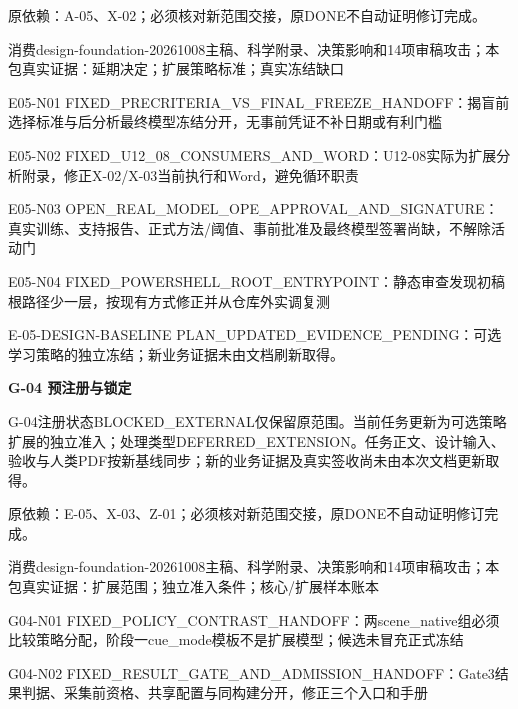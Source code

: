 \documentclass[11pt,a4paper]{article}
\newcommand{\reviewsection}[1]{\par\Needspace{5\baselineskip}\vspace{10pt}\begin{center}{\titlelatin\titlecjk\bfseries\fontsize{14}{20}\selectfont #1}\end{center}}
\begin{document}
原依赖：A-\allowbreak{}05、X-\allowbreak{}02；必须核对新范围交接，原DONE不自动证明修订完成。


消费design-\allowbreak{}foundation-\allowbreak{}20261008主稿、科学附录、决策影响和14项审稿攻击；本包真实证据：延期决定；扩展策略标准；真实冻结缺口


E05-\allowbreak{}N01 FIXED\_\allowbreak{}PRECRITERIA\_\allowbreak{}VS\_\allowbreak{}FINAL\_\allowbreak{}FREEZE\_\allowbreak{}HANDOFF：揭盲前选择标准与后分析最终模型冻结分开，无事前凭证不补日期或有利门槛


E05-\allowbreak{}N02 FIXED\_\allowbreak{}U12\_\allowbreak{}08\_\allowbreak{}CONSUMERS\_\allowbreak{}AND\_\allowbreak{}WORD：U12-\allowbreak{}08实际为扩展分析附录，修正X-\allowbreak{}02/\allowbreak{}X-\allowbreak{}03当前执行和Word，避免循环职责


E05-\allowbreak{}N03 OPEN\_\allowbreak{}REAL\_\allowbreak{}MODEL\_\allowbreak{}OPE\_\allowbreak{}APPROVAL\_\allowbreak{}AND\_\allowbreak{}SIGNATURE：真实训练、支持报告、正式方法/\allowbreak{}阈值、事前批准及最终模型签署尚缺，不解除活动门


E05-\allowbreak{}N04 FIXED\_\allowbreak{}POWERSHELL\_\allowbreak{}ROOT\_\allowbreak{}ENTRYPOINT：静态审查发现初稿根路径少一层，按现有方式修正并从仓库外实调复测


E-\allowbreak{}05-\allowbreak{}DESIGN-\allowbreak{}BASELINE PLAN\_\allowbreak{}UPDATED\_\allowbreak{}EVIDENCE\_\allowbreak{}PENDING：可选学习策略的独立冻结；新业务证据未由文档刷新取得。


\reviewsection{G-\allowbreak{}04 预注册与锁定}
G-\allowbreak{}04注册状态BLOCKED\_\allowbreak{}EXTERNAL仅保留原范围。当前任务更新为可选策略扩展的独立准入；处理类型DEFERRED\_\allowbreak{}EXTENSION。任务正文、设计输入、验收与人类PDF按新基线同步；新的业务证据及真实签收尚未由本次文档更新取得。


原依赖：E-\allowbreak{}05、X-\allowbreak{}03、Z-\allowbreak{}01；必须核对新范围交接，原DONE不自动证明修订完成。


消费design-\allowbreak{}foundation-\allowbreak{}20261008主稿、科学附录、决策影响和14项审稿攻击；本包真实证据：扩展范围；独立准入条件；核心/\allowbreak{}扩展样本账本


G04-\allowbreak{}N01 FIXED\_\allowbreak{}POLICY\_\allowbreak{}CONTRAST\_\allowbreak{}HANDOFF：两scene\_\allowbreak{}native组必须比较策略分配，阶段一cue\_\allowbreak{}mode模板不是扩展模型；候选未冒充正式冻结


G04-\allowbreak{}N02 FIXED\_\allowbreak{}RESULT\_\allowbreak{}GATE\_\allowbreak{}AND\_\allowbreak{}ADMISSION\_\allowbreak{}HANDOFF：Gate3结果判据、采集前资格、共享配置与同构建分开，修正三个入口和手册
\end{document}
